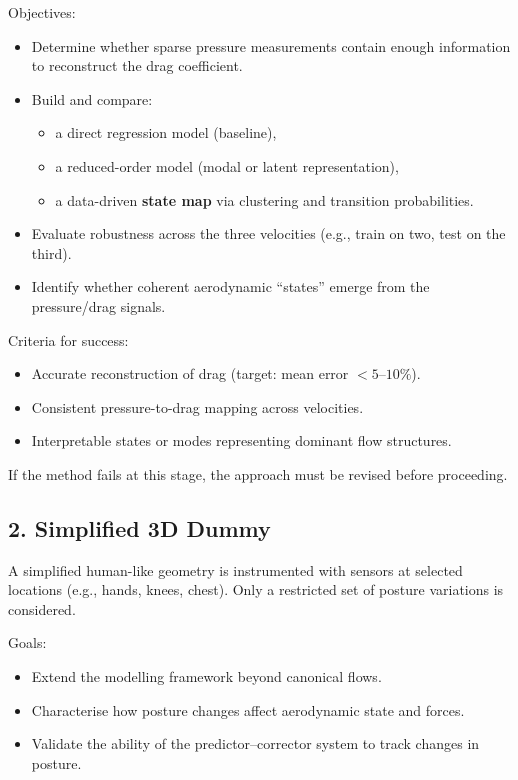 \documentclass[12pt]{article}
\begin{document}
Objectives:
\begin{itemize}
    \item Determine whether sparse pressure measurements contain enough information to reconstruct the drag coefficient.
    \item Build and compare:
    \begin{itemize}
        \item a direct regression model (baseline),
        \item a reduced-order model (modal or latent representation),
        \item a data-driven \textbf{state map} via clustering and transition probabilities.
    \end{itemize}
    \item Evaluate robustness across the three velocities (e.g., train on two, test on the third).
    \item Identify whether coherent aerodynamic ``states'' emerge from the pressure/drag signals.
\end{itemize}

Criteria for success:
\begin{itemize}
    \item Accurate reconstruction of drag (target: mean error $<5$--$10\%$).
    \item Consistent pressure-to-drag mapping across velocities.
    \item Interpretable states or modes representing dominant flow structures.
\end{itemize}

If the method fails at this stage, the approach must be revised before proceeding.

\subsection*{2. Simplified 3D Dummy}
A simplified human-like geometry is instrumented with sensors at selected locations (e.g., hands, knees, chest). Only a restricted set of posture variations is considered.

Goals:
\begin{itemize}
    \item Extend the modelling framework beyond canonical flows.
    \item Characterise how posture changes affect aerodynamic state and forces.
    \item Validate the ability of the predictor--corrector system to track changes in posture.
\end{itemize}
\end{document}
